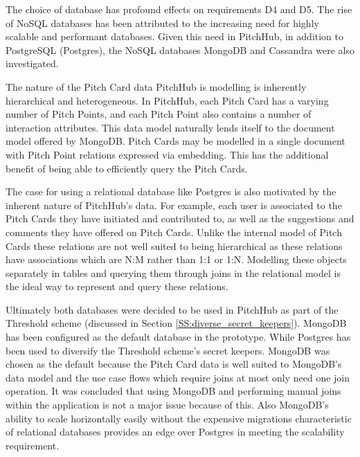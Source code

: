The choice of database has profound effects on requirements D4 and D5. The rise of NoSQL databases has been attributed to the increasing need for highly scalable and performant databases. Given this need in PitchHub, in addition to PostgreSQL (Postgres), the NoSQL databases MongoDB and Cassandra were also investigated.
\par
The nature of the Pitch Card data PitchHub is modelling is inherently hierarchical and heterogeneous. In PitchHub, each Pitch Card has a varying number of Pitch Points, and each Pitch Point also contains a number of interaction attributes. This data model naturally lends itself to the document model offered by MongoDB. Pitch Cards may be modelled in a single document with Pitch Point relations expressed via embedding. This has the additional benefit of being able to efficiently query the Pitch Cards.
\par
The case for using a relational database like Postgres is also motivated by the inherent nature of PitchHub's data. For example, each user is associated to the Pitch Cards they have initiated and contributed to, as well as the suggestions and comments they have offered on Pitch Cards. Unlike the internal model of Pitch Cards these relations are not well suited to being hierarchical as these relations have associations which are N:M rather than 1:1 or 1:N. Modelling these objects separately in tables and querying them through joins in the relational model is the ideal way to represent and query these relations.
\par
Ultimately both databases were decided to be used in PitchHub as part of the Threshold scheme (discussed in Section \ref{SS:diverse_secret_keepers}). MongoDB has been configured as the default database in the prototype. While Postgres has been used to diversify the Threshold scheme's secret keepers. MongoDB was chosen as the default because the Pitch Card data is well suited to MongoDB's data model and the use case flows which require joins at most only need one join operation. It was concluded that using MongoDB and performing manual joins within the application is not a major issue because of this. Also MongoDB's ability to scale horizontally easily without the expensive migrations characteristic of relational databases provides an edge over Postgres in meeting the scalability requirement.
